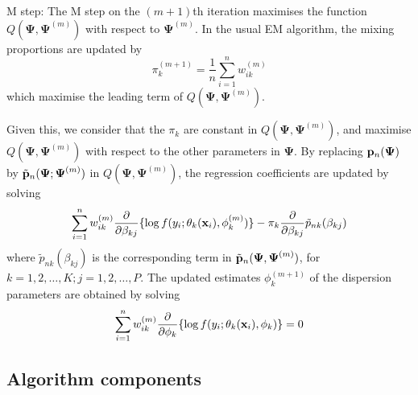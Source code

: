 \documentclass{article}
\newcommand{\bx}{{\bf{x}}}                                                 %
\newcommand{\bPsi}{\boldsymbol \Psi}                              %
\newcommand{\bp}{{\bf p}}                                  %
\begin{document}
\noindent M step: The M step on the $(m + 1)$th iteration maximises the function $Q(\bPsi, \bPsi^{(m)})$ with respect to $\bPsi^{(m)}$. In the usual EM algorithm, the mixing proportions are updated by 
    $$\pi_k^{(m+1)} = \frac{1}{n}\sum_{i=1}^nw_{ik}^{(m)}$$
which maximise the leading term of $Q(\bPsi, \bPsi^{(m)})$.

Given this, we consider that the $\pi_k$ are constant in $Q(\bPsi, \bPsi^{(m)})$, and maximise $Q(\bPsi, \bPsi^{(m)})$ with respect to the other parameters in $\bPsi$. By replacing $\bp_n(\bPsi)$ by ${\tilde {\bp}_n}( \bPsi; \bPsi^{(m)})$ in $Q(\bPsi, \bPsi^{(m)})$, the regression coefficients are updated by solving
    $$\sum_{i=1}^nw_{ik}^{(m)}\frac{\partial}{\partial \beta_{kj}} \{ \log f(y_i; \theta_k(\bx_i), \phi_k^{(m)})\} 
        - \pi_k\frac{\partial}{\partial \beta_{kj}}{\tilde {p}_{nk}}(\beta_{kj}) $$
where ${\tilde {p}_{nk}}(\beta_{kj})$ is the corresponding term in ${\tilde {\bp}_n}(\bPsi, \bPsi^{(m)})$, for $k = 1, 2, \ldots, K; j = 1, 2, \ldots, P$. The updated estimates $\phi_k^{(m+1)}$ of the dispersion parameters are obtained by solving
    $$\sum_{i=1}^nw_{ik}^{(m)}\frac{\partial}{\partial \phi_{k}}\{\log f(y_i;\theta_k(\bx_i), \phi_k)\}  = 0$$
\clearpage

\subsection*{Algorithm components}
\end{document}
